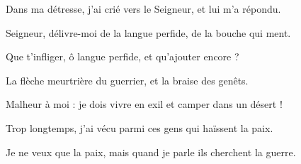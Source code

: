 \item Dans ma détresse, j'ai crié vers le Seigneur, et lui m'a répondu. 

\item Seigneur, délivre-moi de la langue perfide, de la bouche qui ment.

\item Que t'infliger, ô langue perfide, et qu'ajouter encore ? 

\item La flèche meurtrière du guerrier, et la braise des genêts.

\item Malheur à moi : je dois vivre en exil et camper dans un désert !

\item Trop longtemps, j'ai vécu parmi ces gens qui haïssent la paix.

\item Je ne veux que la paix, mais quand je parle ils cherchent la guerre.
